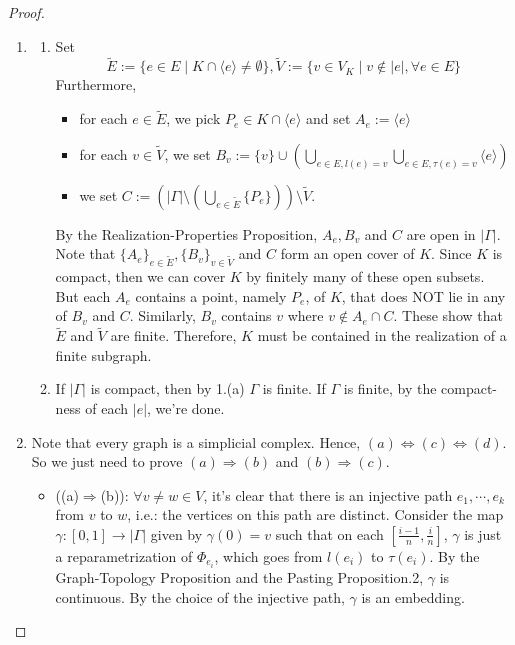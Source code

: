 \begin{proof}
    \begin{enumerate}
        \item \begin{enumerate}
            \item Set
            $$\tilde{E} := \{ e\in E\mid K \cap \langle e\rangle \neq \emptyset\}, \tilde{V}:= \{ v \in V_K \mid v \notin |e| ,\forall e\in E\}$$
            Furthermore,\begin{itemize}
                \item for each $e \in \tilde{E}$, we pick $P_e \in K \cap \langle e\rangle$ and set $A_e:= \langle e\rangle$
                \item for each $v\in \tilde{V}$, we set $B_v:= \{v\} \cup (\bigcup_{e\in E,l(e)=v} \bigcup_{e\in E,\tau(e)=v} \langle e\rangle)$
                \item we set $C:= (|\Gamma| \setminus (\bigcup_{e\in \tilde{E}} \{P_e\})) \setminus \tilde{V}$.
            \end{itemize}
            By the Realization-Properties Proposition, $A_e,B_v$ and $C$ are open in $|\Gamma|$. Note that $\{A_e\}_{e \in \tilde{E}}, \{ B_v\}_{v \in \tilde{V}}$ and $C$ form an open cover of $K$. Since $K$ is compact, then we can cover $K$ by finitely many of these open subsets.\\
            But each $A_e$ contains a point, namely $P_e$, of $K$, that does NOT lie in any of $B_v$ and $C$. Similarly, $B_v$ contains $v$ where $v \notin A_e \cap C$. These show that $\tilde{E}$ and $\tilde{V}$ are finite. Therefore, $K$ must be contained in the realization of a finite subgraph.

            \item If $|\Gamma|$ is compact, then by 1.(a) $\Gamma$ is finite. If $\Gamma$ is finite, by the compact-ness of each $|e|$, we're done.
        \end{enumerate}

        \item Note that every graph is a simplicial complex. Hence, $(a) \Leftrightarrow (c) \Leftrightarrow (d)$. So we just need to prove $(a) \Rightarrow (b)$ and $(b) \Rightarrow (c)$.
        \begin{itemize}
            \item ((a)$\Rightarrow$(b)): $\forall v\neq w \in V$, it's clear that there is an injective path $e_1,\cdots, e_k$ from $v$ to $w$, i.e.: the vertices on this path are distinct. Consider the map $\gamma: [0,1] \to |\Gamma|$ given by $\gamma(0) =v$ such that on each $[ \frac{i-1}{n}, \frac{i}{n}]$, $\gamma$ is just a reparametrization of $\Phi_{e_i}$, which goes from $l(e_i)$ to $\tau(e_i)$. By the Graph-Topology Proposition and the Pasting Proposition.2, $\gamma$ is continuous. By the choice of the injective path, $\gamma$ is an embedding.


\end{itemize}
\end{enumerate}
\end{proof}
